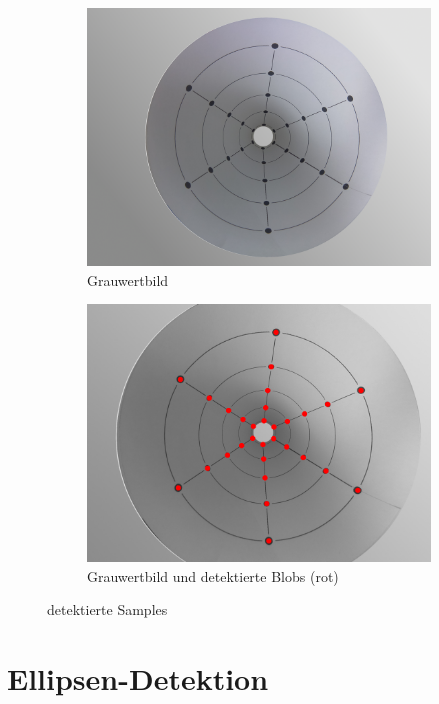 \begin{figure}[!htb]
	\centering
	\begin{subfigure}{.5\textwidth}
		\centering
		\includegraphics[width=.9\textwidth]{images/coneRasp.jpg}
		\caption{Grauwertbild}
	\end{subfigure}%
	\begin{subfigure}{.5\textwidth}
		\centering
		\includegraphics[width=.9\textwidth]{images/coneRaspDetectedDots.png}
		\caption{Grauwertbild und detektierte Blobs (rot)}
	\end{subfigure}
	\caption{detektierte Samples}
	\label{fig:blobDetect}
\end{figure}


\section{Ellipsen-Detektion}
\label{s:ellipseDetection}

